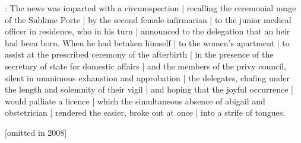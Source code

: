 

:
The news was imparted with a circumspection |
recalling the ceremonial usage of the Sublime Porte |
by the second female infirmarian |
to the junior medical officer in residence,
who in his turn |
announced to the delegation
that an heir had been born.
When he had betaken himself |
to the women's apartment |
to assist at the prescribed ceremony of the afterbirth |
in the presence of the secretary of state for domestic affairs |
and the members of the privy council,
silent in unanimous exhaustion and approbation |
the delegates,
chafing under the length and solemnity of their vigil |
and hoping that the joyful occurrence |
would palliate a licence |
which the simultaneous absence of abigail and obstetrician |
rendered the easier,
broke out at once |
into a strife of tongues.

[omitted in 2008]

